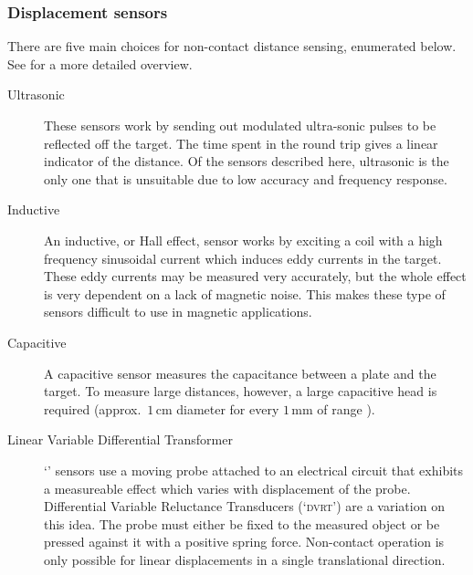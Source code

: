 \documentclass[11pt,a4paper]{memoir}
\begin{document}
\subsubsection{Displacement sensors}

There are five main choices for non-contact distance sensing,
enumerated below. See \textcite{boehm1993} for a more detailed overview.
\begin{description}

\item[Ultrasonic]

    These sensors work by sending out modulated
    ultra-sonic pulses to be reflected off the target. The time spent
    in the round trip gives a linear indicator of the
    distance. Of the sensors described here, ultrasonic is the only one
    that is unsuitable due to low accuracy and frequency response.

\item[Inductive]

    An inductive, or Hall effect, sensor works by exciting a coil with a high
    frequency sinusoidal current which induces eddy currents in the target.
    These eddy currents may be measured very accurately, but the whole effect
    is very dependent on a lack of magnetic noise. This makes these type of
    sensors difficult to use in magnetic applications.

\item[Capacitive]

    A capacitive sensor measures the capacitance between a plate and the
    target.
    To measure large distances, however, a large capacitive head is
    required (approx.\ $1$\,cm diameter for every $1$\,mm of range
    \cite{boehm1993}).

\item[Linear Variable Differential Transformer]

    `' sensors use a moving probe attached to an electrical
    circuit that exhibits a measureable effect which varies with displacement
    of the probe.
    Differential Variable Reluctance Transducers
    (`\textsc{dvrt}') are a variation on this idea. The probe must either be
    fixed to the measured object or be pressed against it with a positive
    spring force. Non-contact operation is only possible for linear
    displacements in a single translational direction.


\end{description}
\end{document}
